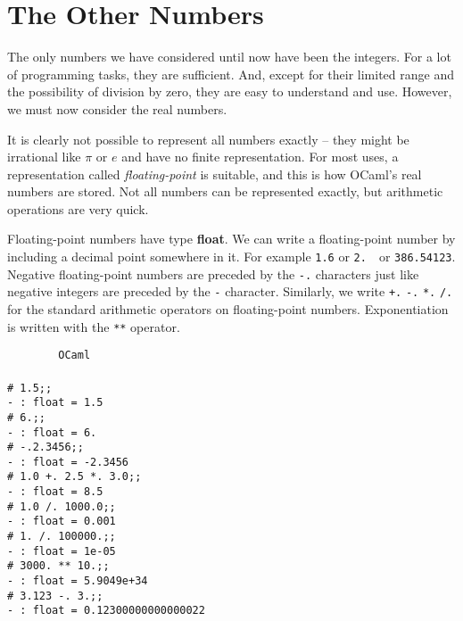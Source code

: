 \documentclass[]{book}
\newcommand{\smspace}{\vspace{4mm}}
\begin{document}
\pagestyle{empty}


\chapter{The Other Numbers}
\pagestyle{fancy}
\label{gettingreal}

The only numbers we have considered until now have been the integers. For a lot of programming tasks, they are sufficient. And, except for their limited range and the possibility of division by zero, they are easy to understand and use. However, we must now consider the real numbers.

It is clearly not possible to represent all numbers exactly -- they might be irrational like $\pi$ or $e$ and have no finite representation. For most uses, a representation called \textit{floating-point} is suitable, and this is how OCaml's real numbers are stored. Not all numbers can be represented exactly, but arithmetic operations are very quick.

Floating-point numbers have type \textbf{\textsf{float}}. We can write a floating-point number by including a decimal point somewhere in it. For example \verb!1.6! or \verb!2.!\!\!\ \ or \texttt{386.54123}. Negative floating-point numbers are preceded by the \verb!-.! characters just like negative integers are preceded by the \verb!-! character. Similarly, we write \verb!+.! \verb!-.! \verb!*.! \verb!/.! for the standard arithmetic operators on floating-point numbers. Exponentiation is written with the \verb!**! operator.

\smspace
\noindent\verb!        OCaml!\\
\noindent\\
\noindent\verb!# 1.5;;!\\
\verb!- : float = 1.5!\\
\verb!# 6.;;!\\
\verb!- : float = 6.!\\
\verb!# -.2.3456;;!\\
\verb!- : float = -2.3456!\\
\verb!# 1.0 +. 2.5 *. 3.0;;!\\
\verb!- : float = 8.5!\\
\verb!# 1.0 /. 1000.0;;!\\
\verb!- : float = 0.001!\\
\verb!# 1. /. 100000.;;!\\
\verb!- : float = 1e-05!\\
\verb!# 3000. ** 10.;;!\\
\verb!- : float = 5.9049e+34!\\
\verb!# 3.123 -. 3.;;!\\
\verb!- : float = 0.12300000000000022!\vphantom{g}
\smspace
\end{document}
